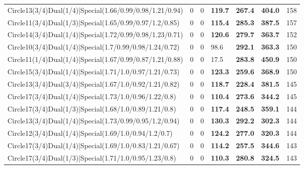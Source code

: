 \begin{tabular}{lrrlllr}
 Circle13(3/4)Dual(1/4)|Special(1.66/0.99/0.98/1.21/0.94)     &          0   &            0   & \textbf{119.7} & \textbf{267.4} & \textbf{404.0} &          158 \\
 Circle11(3/4)Dual(1/3)|Special(1.65/0.99/0.97/1.2/0.85)      &          0   &            0   & \textbf{115.4} & \textbf{285.3} & \textbf{387.5} &          157 \\
 Circle14(3/4)Dual(1/4)|Special(1.72/0.99/0.98/1.23/0.71)     &          0   &            0   & \textbf{120.6} & \textbf{279.7} & \textbf{363.7} &          152 \\
 Circle10(3/4)Dual(1/4)|Special(1.7/0.99/0.98/1.24/0.72)      &          0   &            0   & 98.6           & \textbf{292.1} & \textbf{363.3} &          150 \\
 Circle11(1/4)Dual(1/4)|Special(1.67/0.99/0.87/1.21/0.88)     &          0   &            0   & 17.5           & \textbf{283.8} & \textbf{450.9} &          150 \\
 Circle15(3/4)Dual(1/4)|Special(1.71/1.0/0.97/1.21/0.73)      &          0   &            0   & \textbf{123.3} & \textbf{259.6} & \textbf{368.9} &          150 \\
 Circle13(3/4)Dual(3/4)|Special(1.67/1.0/0.92/1.21/0.82)      &          0   &            0   & \textbf{118.7} & \textbf{228.4} & \textbf{381.5} &          145 \\
 Circle17(3/4)Dual(1/4)|Special(1.73/1.0/0.96/1.22/0.8)       &          0   &            0   & \textbf{110.4} & \textbf{273.6} & \textbf{344.2} &          145 \\
 Circle17(3/4)Dual(1/3)|Special(1.68/1.0/0.89/1.21/0.8)       &          0   &            0   & \textbf{117.4} & \textbf{248.5} & \textbf{359.1} &          144 \\
 Circle13(3/4)Dual(1/4)|Special(1.73/0.99/0.95/1.2/0.94)      &          0   &            0   & \textbf{130.3} & \textbf{292.2} & \textbf{302.3} &          144 \\
 Circle12(3/4)Dual(1/4)|Special(1.69/1.0/0.94/1.2/0.7)        &          0   &            0   & \textbf{124.2} & \textbf{277.0} & \textbf{320.3} &          144 \\
 Circle17(3/4)Dual(1/4)|Special(1.69/1.0/0.83/1.21/0.67)      &          0   &            0   & \textbf{114.2} & \textbf{257.5} & \textbf{344.6} &          143 \\
 Circle17(3/4)Dual(1/3)|Special(1.71/1.0/0.95/1.23/0.8)       &          0   &            0   & \textbf{110.3} & \textbf{280.8} & \textbf{324.5} &          143 \\

\end{tabular}
